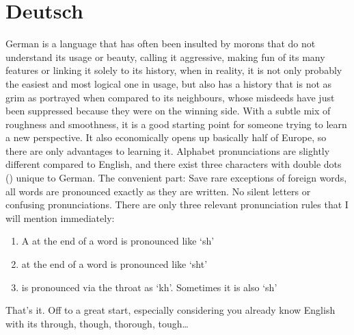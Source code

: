 \chapter[German]{Deutsch} \label{chap:de}
{\color{intro}\textit{}}

German is a language that has often been insulted by morons that do not understand its usage or beauty, calling it aggressive, making fun of its many features or linking it solely to its history, when in reality, it is not only probably the easiest and most logical one in usage, but also has a history that is not as grim as portrayed when compared to its neighbours, whose misdeeds have just been suppressed because they were on the winning side. With a subtle mix of roughness and smoothness, it is a good starting point for someone trying to learn a new perspective. It also economically opens up basically half of Europe, so there are only advantages to learning it. Alphabet pronunciations are slightly different compared to English, and there exist three characters with double dots () unique to German. The convenient part: Save rare exceptions of foreign words, all words are pronounced exactly as they are written. No silent letters or confusing pronunciations. There are only three relevant pronunciation rules that I will mention immediately:
\begin{enumerate}
    \item A \textgerman{} at the end of a word is pronounced like  \enquote*{sh}
    \item \textgerman{} at the end of a word is pronounced like \enquote*{sht}
    \item \textgerman{} is pronounced via the throat as  \enquote*{kh}. Sometimes it is also \enquote*{sh}
\end{enumerate}
That's it. Off to a great start, especially considering you already know English with its through, though, thorough, tough\ldots





